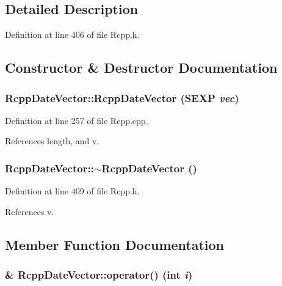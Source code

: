 \subsection{Detailed Description}


Definition at line 406 of file Rcpp.h.

\subsection{Constructor \& Destructor Documentation}
\hypertarget{classRcppDateVector_a65de4c0807f5c4b33429c8ebb5224831}{
\subsubsection[{RcppDateVector}]{\setlength{\rightskip}{0pt plus 5cm}RcppDateVector::RcppDateVector (SEXP {\em vec})}}
\label{classRcppDateVector_a65de4c0807f5c4b33429c8ebb5224831}


Definition at line 257 of file Rcpp.cpp.

References length, and v.\hypertarget{classRcppDateVector_aad0851f7555a09615ccb17bcb20fc7f1}{
\subsubsection[{$\sim$RcppDateVector}]{\setlength{\rightskip}{0pt plus 5cm}RcppDateVector::$\sim$RcppDateVector ()}}
\label{classRcppDateVector_aad0851f7555a09615ccb17bcb20fc7f1}


Definition at line 409 of file Rcpp.h.

References v.

\subsection{Member Function Documentation}
\hypertarget{classRcppDateVector_a7a6d9ceb233ed06f037013bdf4088a23}{
\subsubsection[{operator()}]{\& RcppDateVector::operator() (int {\em i})}}
\label{classRcppDateVector_a7a6d9ceb233ed06f037013bdf4088a23}



